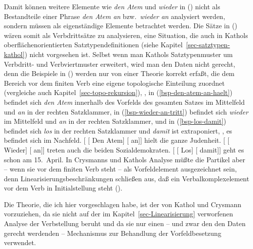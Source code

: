 Damit können weitere Elemente wie \emph{den Atem} und \emph{wieder} in () nicht als
Bestandteile einer Phrase \emph{den Atem an} bzw.\ \emph{wieder an} analysiert werden, sondern
müssen als eigenständige Elemente betrachtet werden. Die Sätze in () wären somit als
Verbdrittsätze zu analysieren, eine Situation, die auch in Kathols oberflächenorientierten
Satztypendefinitionen (siehe Kapitel~\ref{sec-satztypen-kathol}) nicht vorgesehen ist. Selbst wenn man Kathols
Satztypenmuster um Verbdritt- und Verbviertmuster erweitert, wird man den Daten nicht gerecht, denn
die Beispiele in () werden nur von einer Theorie korrekt erfaßt, die dem Bereich
vor dem finiten Verb eine eigene topologische Einteilung zuordnet (vergleiche auch Kapitel~\ref{sec-topo-rekursion}),
\dash, in (\ref{bsp-den-atem-an-haelt}) befindet sich \emph{den Atem} innerhalb des Vorfelds
des gesamten Satzes im Mittelfeld und \emph{an} in der rechten Satzklammer,
in (\ref{bsp-wieder-an-tritt}) befindet sich \emph{wieder} im Mittelfeld und \emph{an} in der rechten Satzklammer,
und in (\ref{bsp-los-damit}) befindet sich \emph{los} in der rechten Satzklammer und \emph{damit}
ist extraponiert, \dash, es befindet sich im Nachfeld.
\eal
\label{bsp-partikel+anderes+material-topo-felder}
\ex\label{bsp-den-atem-an-haelt-zwei}
{}[ [ Den Atem] [ an]] hielt die ganze Judenheit.
\ex\label{bsp-wieder-an-tritt-zwei}
{}[ [ Wieder] [ an]] treten auch die beiden Sozialdemokraten.
\ex\label{bsp-los-damit-zwei}
{}[ [ Los] [ damit]] geht es schon am 15.\ April.
\zl
In Crysmanns und Kathols Analyse müßte die Partikel aber -- wenn sie vor dem finiten Verb
steht -- als Vorfeldelement ausgezeichnet sein, denn Linearisierungsbeschränkungen schließen
aus, daß ein Verbalkomplexelement vor dem Verb in Initialstellung steht (\citealp[]{Crysmann2002a}).%

Die Theorie, die ich hier vorgeschlagen habe, ist der von Kathol und Crysmann vorzuziehen,
da sie nicht auf der im Kapitel~\ref{sec-Linearisierung} verworfenen Analyse der Verbstellung 
beruht und da sie nur einen -- und zwar den den Daten gerecht werdenden -- 
Mechanismus zur Behandlung der Vorfeldbesetzung verwendet.

